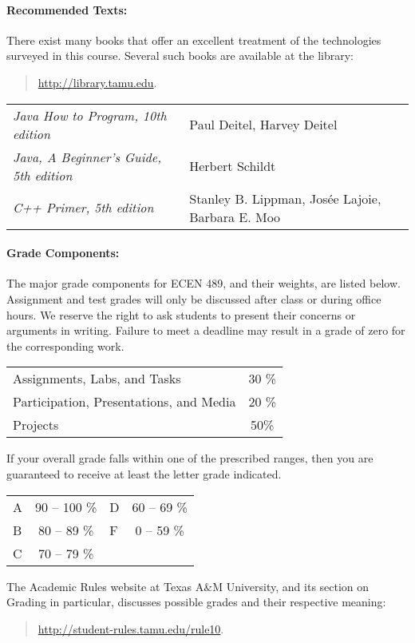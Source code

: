 \documentclass[letterpaper,11pt]{article}
\begin{document}
\paragraph{Recommended Texts:}
There exist many books that offer an excellent treatment of the technologies surveyed in this course.
Several such books are available at the library:
\begin{quote}
\url{http://library.tamu.edu}.
\end{quote}
\begin{center}
\begin{tabular}{ll}
\emph{Java How to Program, 10th edition} & Paul Deitel, Harvey Deitel \tabularnewline
\emph{Java, A Beginner's Guide, 5th edition} & Herbert Schildt \tabularnewline
\emph{C++ Primer, 5th edition} & Stanley B. Lippman, Jos\'{e}e Lajoie, Barbara E. Moo
\end{tabular}
\end{center}

\paragraph{Grade Components:}
The major grade components for ECEN 489, and their weights, are listed below.
Assignment and test grades will only be discussed after class or during office hours.
We reserve the right to ask students to present their concerns or arguments in writing.
Failure to meet a deadline may result in a grade of zero for the corresponding work.
\begin{center}
\begin{tabular}{lc}
Assignments, Labs, and Tasks & 30 \% \\
Participation, Presentations, and Media & 20 \% \\
Projects & 50\%
\end{tabular}
\end{center}
If your overall grade falls within one of the prescribed ranges, then you are guaranteed to receive at least the letter grade indicated.
\begin{center}
\begin{tabular}{lclc}
A & 90 -- 100 \% & D & 60 -- 69 \% \\
B & 80 -- 89 \% & F & 0 -- 59 \% \\
C & 70 -- 79 \%
\end{tabular}
\end{center}
The Academic Rules website at Texas A\&M University, and its section on Grading in particular, discusses possible grades and their respective meaning:
\begin{quote}
\url{http://student-rules.tamu.edu/rule10}.
\end{quote}
\end{document}
